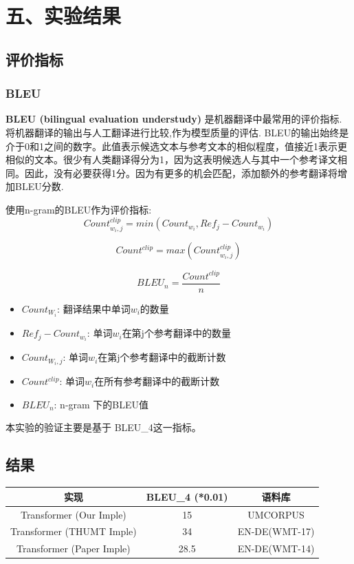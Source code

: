 \documentclass[UTF8,a4paper,10pt]{ctexart}
\begin{document}
\setcounter{section}{5}
\section*{五、实验结果}

\setcounter{subsection}{0}
\subsection{评价指标}
\subsubsection{BLEU}
\textbf{BLEU (bilingual evaluation understudy)} 是机器翻译中最常用的评价指标. 将机器翻译的输出与人工翻译进行比较,作为模型质量的评估.
BLEU的输出始终是介于0和1之间的数字。此值表示候选文本与参考文本的相似程度，值接近1表示更相似的文本。很少有人类翻译得分为1，因为这表明候选人与其中一个参考译文相同。因此，没有必要获得1分。因为有更多的机会匹配，添加额外的参考翻译将增加BLEU分数.

使用n-gram的BLEU作为评价指标:
  $$
    Count_{w_i, j}^{clip} = min(Count_{w_i}, Ref_j-Count_{w_i})
  $$

  $$
    Count^{clip} = max(Count_{w_i, j}^{clip}) 
  $$
  
  $$
    BLEU_{n} = \frac{Count^{clip}}{n}
  $$

  \begin{tcolorbox}
  \begin{itemize}
      \item $Count_{W_i}$: 翻译结果中单词$w_i$的数量
      \item $Ref_j-Count_{w_i}$: 单词$w_i$在第j个参考翻译中的数量
      \item $Count_{W_i, j}$: 单词$w_i$在第j个参考翻译中的截断计数
      \item $Count^{clip}$: 单词$w_i$在所有参考翻译中的截断计数
      \item $BLEU_n$: n-gram 下的BLEU值
  \end{itemize}
\end{tcolorbox}

  本实验的验证主要是基于 BLEU\_4这一指标。



\subsection{结果}
\begin{tabular}{ccc}
  \hline
  实现 & BLEU\_4 (*0.01) & 语料库 \\
  \hline
  Transformer (Our Imple) & 15 & UMCORPUS \\
  Transformer (THUMT Imple) & 34 & EN-DE(WMT-17) \\
  Transformer (Paper Imple) & 28.5 & EN-DE(WMT-14) \\  
  \hline
\end{tabular}
\end{document}
